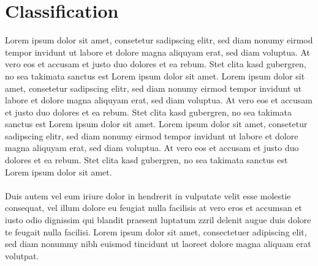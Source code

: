 \section{Classification}
Lorem ipsum dolor sit amet, consetetur sadipscing elitr, sed diam nonumy eirmod tempor invidunt ut labore et dolore magna aliquyam erat, sed diam voluptua. At vero eos et accusam et justo duo dolores et ea rebum. Stet clita kasd gubergren, no sea takimata sanctus est Lorem ipsum dolor sit amet. Lorem ipsum dolor sit amet, consetetur sadipscing elitr, sed diam nonumy eirmod tempor invidunt ut labore et dolore magna aliquyam erat, sed diam voluptua. At vero eos et accusam et justo duo dolores et ea rebum. Stet clita kasd gubergren, no sea takimata sanctus est Lorem ipsum dolor sit amet. Lorem ipsum dolor sit amet, consetetur sadipscing elitr, sed diam nonumy eirmod tempor invidunt ut labore et dolore magna aliquyam erat, sed diam voluptua. At vero eos et accusam et justo duo dolores et ea rebum. Stet clita kasd gubergren, no sea takimata sanctus est Lorem ipsum dolor sit amet.  \\\\Duis autem vel eum iriure dolor in hendrerit in vulputate velit esse molestie consequat, vel illum dolore eu feugiat nulla facilisis at vero eros et accumsan et iusto odio dignissim qui blandit praesent luptatum zzril delenit augue duis dolore te feugait nulla facilisi. Lorem ipsum dolor sit amet, consectetuer adipiscing elit, sed diam nonummy nibh euismod tincidunt ut laoreet dolore magna aliquam erat volutpat.

